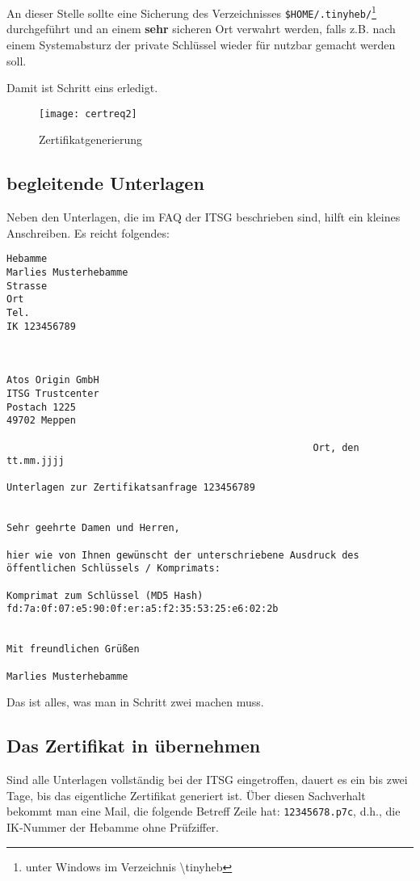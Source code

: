 An dieser Stelle sollte eine Sicherung des Verzeichnisses 
\verb|$HOME/.tinyheb/|\footnote{unter Windows im Verzeichnis \textbackslash tinyheb}
durchgeführt und an einem \textbf{sehr} sicheren Ort
verwahrt werden, falls z.B. nach einem Systemabsturz der private
Schlüssel wieder für \tinyHeb\/ nutzbar gemacht werden soll.
\marginline{\Huge\bfseries!}%

Damit ist Schritt eins erledigt.

\begin{figure}[H]
\centering
\texttt{[image: certreq2]}
\caption{\tinyHeb\/ Zertifikatgenerierung\label{zertifikat2:fig}}
\end{figure}

\subsection{begleitende Unterlagen}
Neben den Unterlagen, die im FAQ der ITSG beschrieben sind, hilft ein
kleines Anschreiben. Es reicht folgendes:
\begin{verbatim}
Hebamme
Marlies Musterhebamme
Strasse
Ort
Tel. 
IK 123456789



Atos Origin GmbH
ITSG Trustcenter
Postach 1225
49702 Meppen

                                                     Ort, den tt.mm.jjjj

Unterlagen zur Zertifikatsanfrage 123456789


Sehr geehrte Damen und Herren,

hier wie von Ihnen gewünscht der unterschriebene Ausdruck des 
öffentlichen Schlüssels / Komprimats:

Komprimat zum Schlüssel (MD5 Hash)
fd:7a:0f:07:e5:90:0f:er:a5:f2:35:53:25:e6:02:2b


Mit freundlichen Grüßen

Marlies Musterhebamme
\end{verbatim}

Das ist alles, was man in Schritt zwei machen muss.

\subsection{Das Zertifikat in \tinyHeb\/ übernehmen}
Sind alle Unterlagen vollständig bei der ITSG eingetroffen, dauert es ein
bis zwei Tage, bis das eigentliche Zertifikat generiert ist. Über diesen
Sachverhalt bekommt man eine Mail, die folgende Betreff Zeile hat:
\verb|12345678.p7c|, d.h., die IK-Nummer der Hebamme ohne Prüfziffer.

